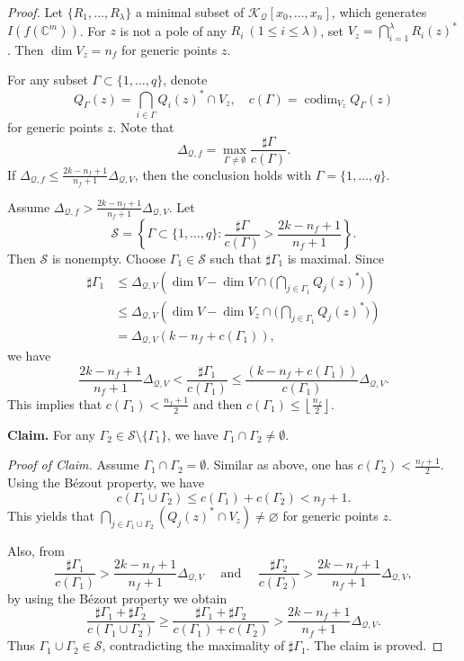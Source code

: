 \documentclass[10pt,a4paper]{amsart}
\newcommand{\C}{{\mathbb{C}}}
\begin{document}
\begin{proof} 
Let $\{R_1,\ldots,R_\lambda\}$ a minimal subset of $\mathcal K_{\mathcal Q}[x_0,\ldots,x_n]$, which generates $I(f(\C^m))$. 
For $z$ is not a pole of any $R_i\ (1\le i\le \lambda)$, set $V_z=\bigcap_{i=1}^\lambda R_i(z)^*$. Then $\dim V_z=n_f$ for generic points $z$.

For any subset $\Gamma \subset \{1,\ldots,q\}$, denote
$$Q_\Gamma(z) = \bigcap_{i \in \Gamma}Q_i(z)^* \cap V_z, \quad c(\Gamma) = \operatorname{codim}_{V_z} Q_\Gamma(z)$$
for generic points $z$. Note that
$$\Delta_{\mathcal Q,f}= \max_{\Gamma \ne \emptyset} \frac{\sharp\Gamma}{c(\Gamma)}.$$
If $\Delta_{\mathcal Q,f}\le \frac{2k-n_f+1}{n_f+1}\Delta_{\mathcal Q,V}$, then the conclusion holds with $\Gamma = \{1,\ldots,q\}$.

Assume $\Delta_{\mathcal Q,f}>\frac{2k-n_f+1}{n_f+1}\Delta_{\mathcal Q,V}$. Let
$$\mathcal{S} = \left\{ \Gamma \subset \{1,\ldots,q\} : \frac{\sharp\Gamma}{c(\Gamma)} >\frac{2k-n_f+1}{n_f+1}\right\}.$$
Then $\mathcal{S}$ is nonempty. Choose $\Gamma_1 \in \mathcal{S}$ such that $\sharp\Gamma_1$ is maximal. Since 
\begin{align*}
\sharp\Gamma_1&\le \Delta_{\mathcal Q,V}\left(\dim V-\dim V\cap\bigl(\bigcap_{j\in\Gamma_1}Q_j(z)^*\bigl)\right)\\
&\le \Delta_{\mathcal Q,V}\left(\dim V-\dim V_z\cap\bigl(\bigcap_{j\in\Gamma_1}Q_j(z)^*\bigl)\right)\\
&=\Delta_{\mathcal Q,V}\left(k-n_f+c(\Gamma_1)\right),
\end{align*} 
we have
$$\frac{2k-n_f+1}{n_f+1}\Delta_{\mathcal Q,V}<\frac{\sharp\Gamma_1}{c(\Gamma_1)}\le \frac{\left(k-n_f+c(\Gamma_1)\right)}{c(\Gamma_1)}\Delta_{\mathcal Q,V}.$$
This implies that $c(\Gamma_1)<\frac{n_f+1}{2}$ and then $c(\Gamma_1)\le \left\lfloor\frac{n_f}{2}\right\rfloor$.

\medskip
\noindent \textbf{Claim.} For any $\Gamma_2 \in \mathcal{S}\setminus\{\Gamma_1\}$, we have $\Gamma_1 \cap \Gamma_2 \ne \emptyset$.
\medskip

\noindent \textit{Proof of Claim.}
Assume $\Gamma_1 \cap \Gamma_2 = \emptyset$. Similar as above, one has $c(\Gamma_2)<\frac{n_f+1}{2}$.  Using the B\'ezout property, we have
$$c(\Gamma_1 \cup \Gamma_2) \le c(\Gamma_1) + c(\Gamma_2)<n_f+1.$$
This yields that $\bigcap_{j\in \Gamma_1 \cup \Gamma_2}(Q_j(z)^*\cap V_z)\ne\varnothing$ for generic points $z$.

Also, from
$$\frac{\sharp\Gamma_1}{c(\Gamma_1)} > \frac{2k-n_f+1}{n_f+1}\Delta_{\mathcal Q,V} \quad\text{ and }\quad \frac{\sharp\Gamma_2}{c(\Gamma_2)} > \frac{2k-n_f+1}{n_f+1}\Delta_{\mathcal Q,V},$$
by using the B\'ezout property we obtain
$$\frac{\sharp\Gamma_1 + \sharp\Gamma_2}{c(\Gamma_1 \cup \Gamma_2)}\ge \frac{\sharp\Gamma_1+\sharp\Gamma_2}{c(\Gamma_1) + c(\Gamma_2)} > \frac{2k-n_f+1}{n_f+1}\Delta_{\mathcal Q,V}.$$
Thus $\Gamma_1 \cup \Gamma_2 \in \mathcal{S}$, contradicting the maximality of $\sharp\Gamma_1$. 
The claim is proved.


\end{proof}
\end{document}

